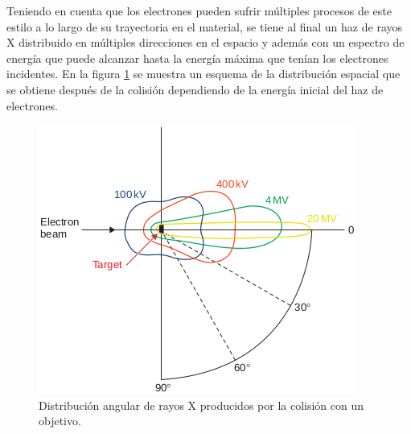 Teniendo en cuenta que los electrones pueden sufrir múltiples procesos de este estilo a lo largo de su trayectoria en el material, se tiene al final un haz de rayos X distribuido en múltiples direcciones en el espacio y además con un espectro de energía que puede alcanzar hasta la energía máxima que tenían los electrones incidentes. En la figura \ref{fig:distribucionAngular} se muestra un esquema de la distribución espacial que se obtiene después de la colisión dependiendo de la energía inicial del haz de electrones. \\

\begin{figure}[H]
	\centering
	\includegraphics[width=0.7\linewidth]{images/distribucionAngular.png}
	\caption{Distribución angular de rayos X producidos por la colisión con un objetivo\cite{khan2014the}.}
	\label{fig:distribucionAngular}
\end{figure}

